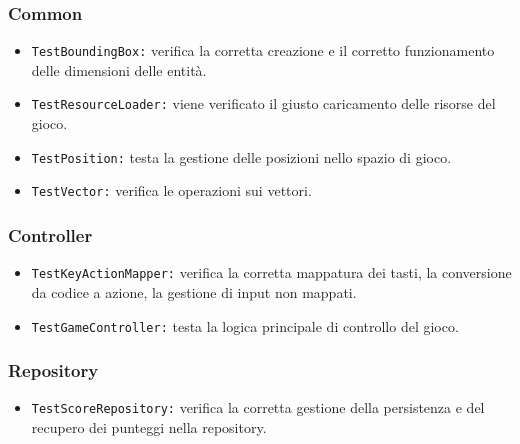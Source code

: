 \documentclass[a4paper,12pt]{report}
\begin{document}
\subsubsection*{Common}
\begin{itemize}
	\item \texttt{TestBoundingBox:} verifica la corretta creazione e il corretto funzionamento delle dimensioni delle entità.
	\item \texttt{TestResourceLoader:} viene verificato il giusto caricamento delle risorse del gioco.
	\item \texttt{TestPosition:} testa la gestione delle posizioni nello spazio di gioco.
	\item \texttt{TestVector:} verifica le operazioni sui vettori.
\end{itemize}

\subsubsection*{Controller}
\begin{itemize}
	\item \texttt{TestKeyActionMapper:} verifica la corretta mappatura dei tasti, la conversione da codice a azione, la gestione di input non mappati.
	\item \texttt{TestGameController:}  testa la logica principale di controllo del gioco.
\end{itemize}

\subsubsection*{Repository}
\begin{itemize}
	\item \texttt{TestScoreRepository:} verifica la corretta gestione della persistenza e del recupero dei punteggi nella repository.
\end{itemize}

\newpage
\end{document}
